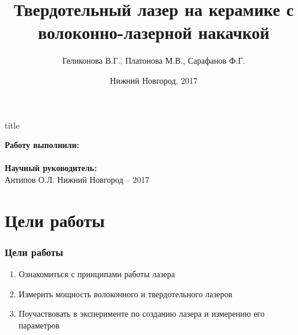 \documentclass[10pt,pdf,hyperref={unicode}, dvipsnames]{beamer}
\title[]{Твердотельный лазер на керамике с волоконно-лазерной накачкой}
\author{%
	Геликонова В.Г., %
	Платонова М.В., %
	Сарафанов Ф.Г. %
}
\institute{Радиофизический факультет ННГУ, 420 группа}
\date{Нижний Новгород, 2017}
\begin{document}
  

\begin{frame}[plain]
	\centering
	\vspace{2cm}
	\begin{beamercolorbox}[sep=8pt,center]{title}
		\bf{}\inserttitle
	\end{beamercolorbox}
	\vspace{0.5cm}
	\normalsize \textbf{Работу выполнили:}\\
	\large\insertauthor\\ 
	\vspace{0.5cm}
	\normalsize{\textbf{Научный руководитель:}\\}
	\large{Антипов О.Л.}
	\vfill
	\small{Нижний Новгород -- 2017}
\end{frame}
\section{Цели работы}
\begin{frame}[t]
	\frametitle{Цели работы}
	\vfill
\begin{spacing}{1}
	\begin{enumerate}
		\item Ознакомиться с принципами работы  лазера
		\item Измерить мощность волоконного и твердотельного лазеров
		\item Поучаствовать в эксперименте по созданию лазера и измерению его параметров	
	\end{enumerate}
\end{spacing}
	\vfill
\end{frame}
\end{document}
